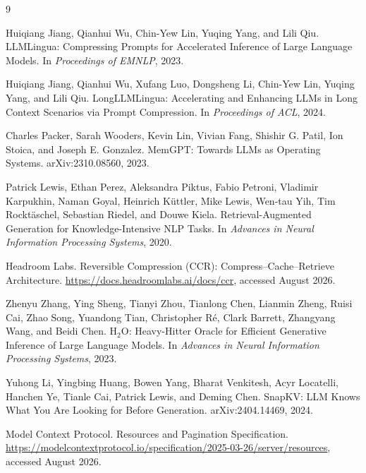 \documentclass[11pt]{article}
\begin{document}
{\small
\begin{thebibliography}{9}
\setlength{\itemsep}{0pt}
\setlength{\parsep}{0pt}

Huiqiang Jiang, Qianhui Wu, Chin-Yew Lin, Yuqing Yang, and Lili Qiu.
\newblock LLMLingua: Compressing Prompts for Accelerated Inference of Large
Language Models.
\newblock In \emph{Proceedings of EMNLP}, 2023.

Huiqiang Jiang, Qianhui Wu, Xufang Luo, Dongsheng Li, Chin-Yew Lin, Yuqing
Yang, and Lili Qiu.
\newblock LongLLMLingua: Accelerating and Enhancing LLMs in Long Context
Scenarios via Prompt Compression.
\newblock In \emph{Proceedings of ACL}, 2024.

Charles Packer, Sarah Wooders, Kevin Lin, Vivian Fang, Shishir G. Patil,
Ion Stoica, and Joseph E. Gonzalez.
\newblock MemGPT: Towards LLMs as Operating Systems.
\newblock arXiv:2310.08560, 2023.

Patrick Lewis, Ethan Perez, Aleksandra Piktus, Fabio Petroni, Vladimir
Karpukhin, Naman Goyal, Heinrich K\"uttler, Mike Lewis, Wen-tau Yih, Tim
Rockt\"aschel, Sebastian Riedel, and Douwe Kiela.
\newblock Retrieval-Augmented Generation for Knowledge-Intensive NLP Tasks.
\newblock In \emph{Advances in Neural Information Processing Systems}, 2020.

Headroom Labs.
\newblock Reversible Compression (CCR): Compress--Cache--Retrieve Architecture.
\newblock \url{https://docs.headroomlabs.ai/docs/ccr}, accessed August 2026.

Zhenyu Zhang, Ying Sheng, Tianyi Zhou, Tianlong Chen, Lianmin Zheng, Ruisi Cai,
Zhao Song, Yuandong Tian, Christopher R\'e, Clark Barrett, Zhangyang Wang, and
Beidi Chen.
\newblock H$_2$O: Heavy-Hitter Oracle for Efficient Generative Inference of
Large Language Models.
\newblock In \emph{Advances in Neural Information Processing Systems}, 2023.

Yuhong Li, Yingbing Huang, Bowen Yang, Bharat Venkitesh, Acyr Locatelli,
Hanchen Ye, Tianle Cai, Patrick Lewis, and Deming Chen.
\newblock SnapKV: LLM Knows What You Are Looking for Before Generation.
\newblock arXiv:2404.14469, 2024.

Model Context Protocol.
\newblock Resources and Pagination Specification.
\newblock \url{https://modelcontextprotocol.io/specification/2025-03-26/server/resources},
accessed August 2026.

\end{thebibliography}
}
\end{document}
